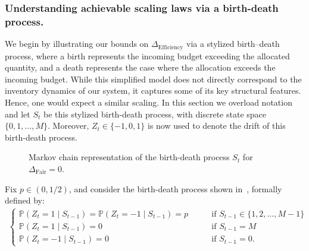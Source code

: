 \documentclass[mnsc,nonblindrev]{informs3}
\newcommand{\pr}{\mathbb{P}}
\newcommand{\Deff}{\Delta_{\text{Efficiency}}\xspace}
\newcommand{\Dfair}{\Delta_{\text{Fair}}\xspace}
\renewcommand{\paragraph}[1]{\subsubsection*{#1}}
\begin{document}
\paragraph{Understanding achievable scaling laws via a birth-death process.} 
We begin by illustrating our bounds on $\Deff$ via a stylized birth–death process, where a birth represents the incoming budget exceeding the allocated quantity, and a death represents the case where the allocation exceeds the incoming budget. While this simplified model does not directly correspond to the inventory dynamics of our system, it captures some of its key structural features. Hence, one would expect a similar scaling. In this section we overload notation and let $S_t$ be this stylized birth-death process, with discrete state space $\{0, 1, \ldots, M\}$. Moreover, $Z_t \in \{-1,0,1\}$ is now used to denote the drift of this birth-death process. 


\begin{figure}[!t]
    \centering
{}
    \caption{Markov chain representation of the birth-death process $S_t$ for $\Dfair = 0$. 
    }
    \label{fig:gamblers ruin chain}
\end{figure}

Fix $p \in (0,1/2)$, and consider the birth-death process  shown in~, formally defined by:
\begin{align*}
\begin{cases}
\pr(Z_t = 1 \mid S_{t-1}) = \pr(Z_t = -1 \mid S_{t-1}) = p \qquad &\text{if } S_{t-1} \in \{1,2,\ldots, M-1\}\\
\pr(Z_t=1 \mid S_{t-1})=0 \quad &\text{if } {S}_{t-1}=M \\
\pr({Z}_t=-1 \mid S_{t-1})=0 \quad &\text{if } {S}_{t-1}=0.
\end{cases}
\end{align*}
\end{document}
